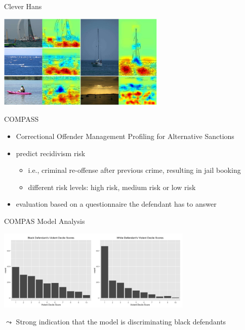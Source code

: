 \documentclass[aspectratio=169]{../latex_main/tntbeamer}  %
\begin{document}
\begin{frame}[c]{Clever Hans }
	
	\centering
	\includegraphics[width=0.6\textwidth]{w01_introduction/figure/boats_maps.PNG}
	
\end{frame}

\begin{frame}[c]{COMPASS}

    \begin{itemize}
        \item Correctional Offender Management Profiling for Alternative Sanctions 
        \item predict recidivism risk
        \begin{itemize}
            \item i.e., criminal re-offense after previous crime, resulting in jail booking
            \item different risk levels: high risk, medium risk or low risk
        \end{itemize}
        \item evaluation based on a questionnaire the defendant has to answer
    \end{itemize}	
	
\end{frame}

\begin{frame}[c]{COMPAS Model Analysis~}
    
    \centering
    \includegraphics[width=0.7\textwidth]{w01_introduction/figure/compass_black_white.PNG}
	
	$\leadsto$ Strong indication that the model is discriminating black defendants
	
\end{frame}
\end{document}
